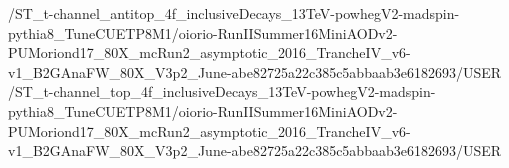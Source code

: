 /ST_t-channel_antitop_4f_inclusiveDecays_13TeV-powhegV2-madspin-pythia8_TuneCUETP8M1/oiorio-RunIISummer16MiniAODv2-PUMoriond17_80X_mcRun2_asymptotic_2016_TrancheIV_v6-v1_B2GAnaFW_80X_V3p2_June-abe82725a22c385c5abbaab3e6182693/USER
/ST_t-channel_top_4f_inclusiveDecays_13TeV-powhegV2-madspin-pythia8_TuneCUETP8M1/oiorio-RunIISummer16MiniAODv2-PUMoriond17_80X_mcRun2_asymptotic_2016_TrancheIV_v6-v1_B2GAnaFW_80X_V3p2_June-abe82725a22c385c5abbaab3e6182693/USER
